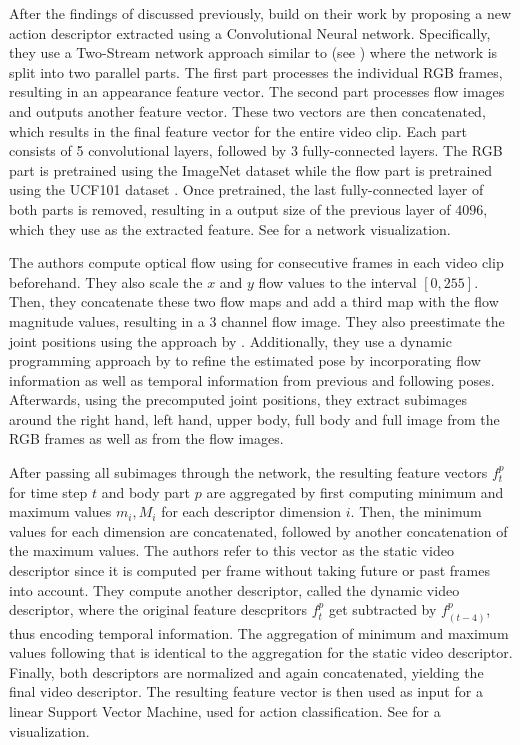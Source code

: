After the findings of \cite{jhuang_towards_2013} discussed previously, \cite{cheron_pcnn_2015} build on their work by proposing a new action descriptor extracted using a Convolutional Neural network.
Specifically, they use a Two-Stream network approach similar to \cite{simonyan_two-stream_2014} (see ) where the network is split into two parallel parts.
The first part processes the individual RGB frames, resulting in an appearance feature vector. 
The second part processes flow images and outputs another feature vector. 
These two vectors are then concatenated, which results in the final feature vector for the entire video clip. 
Each part consists of 5 convolutional layers, followed by 3 fully-connected layers. The RGB part is pretrained using the ImageNet dataset \cite{deng_imagenet:_2009} while the flow part is pretrained using the UCF101 dataset \cite{soomro_ucf101:_2012}. 
Once pretrained, the last fully-connected layer of both parts is removed, resulting in a output size of the previous layer of $4096$, which they use as the extracted feature.
See  for a network visualization.

The authors compute optical flow using \cite{brox_high_2004} for consecutive frames in each video clip beforehand.
They also scale the $x$ and $y$ flow values to the interval $[0, 255]$.
Then, they concatenate these two flow maps and add a third map with the flow magnitude values, resulting in a $3$ channel flow image.
They also preestimate the joint positions using the approach by \cite{yang_articulated_2011}.
Additionally, they use a dynamic programming approach by \cite{cherian_mixing_2014} to refine the estimated pose by incorporating flow information as well as temporal information from previous and following poses.
Afterwards, using the precomputed joint positions, they extract subimages around the right hand, left hand, upper body, full body and full image from the RGB frames as well as from the flow images.

After passing all subimages through the network, the resulting feature vectors $f_t^p$ for time step $t$ and body part $p$ are aggregated by first computing minimum and maximum values $m_i, M_i$ for each descriptor dimension $i$.
Then, the minimum values for each dimension are concatenated, followed by another concatenation of the maximum values.
The authors refer to this vector as the static video descriptor since it is computed per frame without taking future or past frames into account.
They compute another descriptor, called the dynamic video descriptor, where the original feature descpritors $f_t^p$ get subtracted by $f_(t-4)^p$, thus encoding temporal information.
The aggregation of minimum and maximum values following that is identical to the aggregation for the static video descriptor.
Finally, both descriptors are normalized and again concatenated, yielding the final video descriptor.
The resulting feature vector is then used as input for a linear Support Vector Machine, used for action classification.
See  for a visualization.

